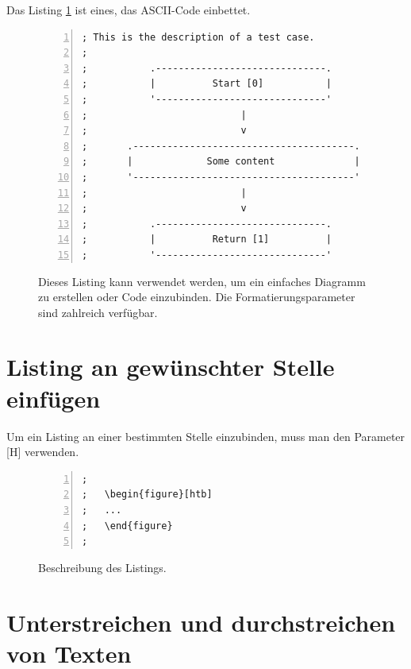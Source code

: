 Das Listing \ref{lst:Diagramm} ist eines, das ASCII-Code einbettet.

\FloatBarrier
\begin{figure}[htb]
\begin{lstlisting}[backgroundcolor={\color{white}},
basicstyle={\normalsize\sffamily},
breaklines=true,
frame={bottomline,topline, rightline},
language=HTML,
numbers=left,
showstringspaces=false,
xleftmargin=22pt]	
; This is the description of a test case.
;
;           .------------------------------.
;           |          Start [0]           |
;           '------------------------------'
;                           |
;                           v
;       .---------------------------------------.
;       |             Some content		        |
;       '---------------------------------------'
;                           |
;                           v
;           .------------------------------.
;           |          Return [1]          |
;           '------------------------------'
\end{lstlisting}
  \caption[Ein Listing mit ASCII-Code und Zeilennummern]{Dieses Listing kann verwendet werden, um ein einfaches Diagramm zu erstellen oder Code einzubinden. Die Formatierungsparameter sind zahlreich verfügbar.}
\label{lst:Diagramm}
\end{figure}




\section{Listing an gewünschter Stelle einfügen}
\label{sec:FigurHierEinfuegen}
Um ein Listing an einer bestimmten Stelle einzubinden, muss man den Parameter [H] verwenden.

\FloatBarrier
\begin{figure}[htb]
\begin{lstlisting}[backgroundcolor={\color{white}},
basicstyle={\normalsize\sffamily},
breaklines=true,
frame={bottomline,topline, rightline},
language=HTML,
numbers=left,
showstringspaces=false,
xleftmargin=22pt]	
; 
;	\begin{figure}[htb]
;	...
;	\end{figure}
;
\end{lstlisting}
  \caption{Beschreibung des Listings.}
\label{lst:FigurGenauHier}
\end{figure}

\section{Unterstreichen und durchstreichen von Texten}
\label{sec:Durchstreichen}

